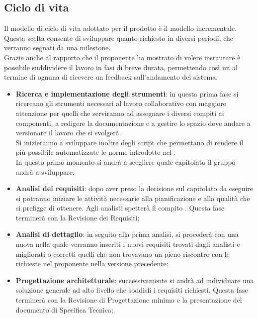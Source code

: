 	\subsection{Ciclo di vita}
Il modello di ciclo di vita adottato per il prodotto è il modello incrementale. \\
Questa scelta consente di sviluppare quanto richiesto in diversi periodi, che verranno segnati da una milestone. \\
Grazie anche al rapporto che il proponente ha mostrato di volere instaurare è possibile suddividere il lavoro in fasi di breve durata, permettendo così un al termine di ognuna di ricevere un feedback sull'andamento del sistema.
		\begin{itemize}
			\item \textbf{Ricerca e implementazione degli strumenti}: in questa prima fase si ricercano gli strumenti necessari al lavoro collaborativo con maggiore attenzione per quelli che serviranno ad assegnare i diversi compiti ai componenti, a redigere la documentazione e a gestire lo spazio dove andare a versionare il lavoro che si svolgerà. \\
Si inizieranno a sviluppare inoltre degli script che permettano di rendere il più possibile automatizzate le norme introdotte nel \docNameVersionNdP. \\
In questo primo momento si andrà a scegliere quale capitolato il gruppo andrà a sviluppare;

			\item \textbf{Analisi dei requisiti}: dopo aver preso la decisione sul capitolato da eseguire si potranno iniziare le attività necessarie alla pianificazione e alla qualità che si prefigge di ottenere.
Agli analisti spetterà il compito 
			. Questa fase terminerà con la Revisione dei Requisiti;

			\item \textbf{Analisi di dettaglio}: in seguito alla prima analisi, si procederà con una nuova nella quale verranno inseriti i nuovi requisiti trovati dagli analisti e migliorati o corretti quelli che non trovavano un pieno riscontro con le richieste nel proponente nella versione precedente;
			
			\item \textbf{Progettazione architetturale}: successivamente si andrà ad individuare una soluzione generale ad alto livello che soddisfi i requisiti richiesti. Questa fase terminerà con la Revisione di Progettazione minima e la presentazione del documento di Specifica Tecnica;


\end{itemize}
